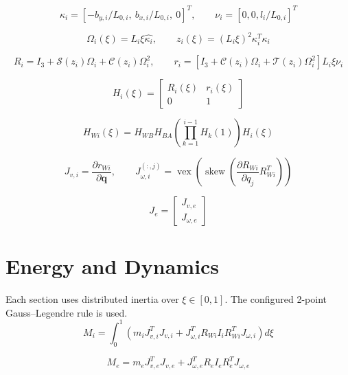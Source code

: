 \documentclass[11pt]{article}
\newcommand{\Sfun}{\mathcal{S}}
\newcommand{\Cfun}{\mathcal{C}}
\newcommand{\Tfun}{\mathcal{T}}
\begin{document}
\begin{equation}
\kappa_i=[-b_{y,i}/L_{0,i},\ b_{x,i}/L_{0,i},\ 0]^T,\qquad\nu_i=[0,0,l_i/L_{0,i}]^T
\end{equation}

\begin{equation}
\Omega_i(\xi)=L_i\xi\widehat{\kappa_i},\qquad z_i(\xi)=(L_i\xi)^2\kappa_i^T\kappa_i
\end{equation}

\begin{equation}
R_i=I_3+\Sfun(z_i)\Omega_i+\Cfun(z_i)\Omega_i^2,\qquad r_i=\left[I_3+\Cfun(z_i)\Omega_i+\Tfun(z_i)\Omega_i^2\right]L_i\xi\nu_i
\end{equation}

\begin{equation}
H_i(\xi)=\begin{bmatrix}R_i(\xi)&r_i(\xi)\\0&1\end{bmatrix}\label{eq:local-transform}
\end{equation}

\begin{equation}
H_{Wi}(\xi)=H_{WB}H_{BA}\left(\prod_{k=1}^{i-1}H_k(1)\right)H_i(\xi)
\end{equation}

\begin{equation}
J_{v,i}=\frac{\partial r_{Wi}}{\partial\boldsymbol q},\qquad J_{\omega,i}^{(:,j)}=\operatorname{vex}\!\left(\operatorname{skew}\!\left(\frac{\partial R_{Wi}}{\partial q_j}R_{Wi}^{T}\right)\right)
\end{equation}

\begin{equation}
J_e=\begin{bmatrix}J_{v,e}\\J_{\omega,e}\end{bmatrix}
\end{equation}


\section{Energy and Dynamics}
Each section uses distributed inertia over $\xi\in[0,1]$. The configured 2-point Gauss--Legendre rule is used.
\begin{equation}
M_i=\int_0^1\!\left(m_iJ_{v,i}^{T}J_{v,i}+J_{\omega,i}^{T}R_{Wi}I_iR_{Wi}^{T}J_{\omega,i}\right)d\xi
\end{equation}

\begin{equation}
M_e=m_eJ_{v,e}^{T}J_{v,e}+J_{\omega,e}^{T}R_eI_eR_e^TJ_{\omega,e}
\end{equation}
\end{document}
